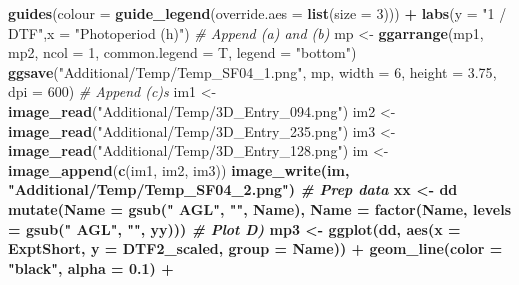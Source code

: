 \documentclass[
]{article}
\newenvironment{Shaded}{\begin{snugshade}}{\end{snugshade}}
\newcommand{\CommentTok}[1]{\textcolor[rgb]{0.56,0.35,0.01}{\textit{#1}}}
\newcommand{\DataTypeTok}[1]{\textcolor[rgb]{0.13,0.29,0.53}{#1}}
\newcommand{\DecValTok}[1]{\textcolor[rgb]{0.00,0.00,0.81}{#1}}
\newcommand{\FloatTok}[1]{\textcolor[rgb]{0.00,0.00,0.81}{#1}}
\newcommand{\KeywordTok}[1]{\textcolor[rgb]{0.13,0.29,0.53}{\textbf{#1}}}
\newcommand{\NormalTok}[1]{#1}
\newcommand{\OperatorTok}[1]{\textcolor[rgb]{0.81,0.36,0.00}{\textbf{#1}}}
\newcommand{\StringTok}[1]{\textcolor[rgb]{0.31,0.60,0.02}{#1}}
\begin{document}
\begin{Shaded}
\begin{Highlighting}[]
{{{{{\StringTok{  }\KeywordTok{guides}\NormalTok{(}\DataTypeTok{colour =} \KeywordTok{guide_legend}\NormalTok{(}\DataTypeTok{override.aes =} \KeywordTok{list}\NormalTok{(}\DataTypeTok{size =} \DecValTok{3}\NormalTok{))) }\OperatorTok{+}
\StringTok{  }\KeywordTok{labs}\NormalTok{(}\DataTypeTok{y =} \StringTok{"1 / DTF"}\NormalTok{,}\DataTypeTok{x =} \StringTok{"Photoperiod (h)"}\NormalTok{)}
\CommentTok{# Append (a) and (b)}
\NormalTok{mp <-}\StringTok{ }\KeywordTok{ggarrange}\NormalTok{(mp1, mp2, }\DataTypeTok{ncol =} \DecValTok{1}\NormalTok{, }\DataTypeTok{common.legend =}\NormalTok{ T, }\DataTypeTok{legend =} \StringTok{"bottom"}\NormalTok{) }
\KeywordTok{ggsave}\NormalTok{(}\StringTok{"Additional/Temp/Temp_SF04_1.png"}\NormalTok{, mp, }\DataTypeTok{width =} \DecValTok{6}\NormalTok{, }\DataTypeTok{height =} \FloatTok{3.75}\NormalTok{, }\DataTypeTok{dpi =} \DecValTok{600}\NormalTok{)}
\CommentTok{# Append (c)s}
\NormalTok{im1 <-}\StringTok{ }\KeywordTok{image_read}\NormalTok{(}\StringTok{"Additional/Temp/3D_Entry_094.png"}\NormalTok{)}
\NormalTok{im2 <-}\StringTok{ }\KeywordTok{image_read}\NormalTok{(}\StringTok{"Additional/Temp/3D_Entry_235.png"}\NormalTok{)}
\NormalTok{im3 <-}\StringTok{ }\KeywordTok{image_read}\NormalTok{(}\StringTok{"Additional/Temp/3D_Entry_128.png"}\NormalTok{)}
\NormalTok{im <-}\StringTok{ }\KeywordTok{image_append}\NormalTok{(}\KeywordTok{c}\NormalTok{(im1, im2, im3)) }\OperatorTok{%
\KeywordTok{image_write}\NormalTok{(im, }\StringTok{"Additional/Temp/Temp_SF04_2.png"}\NormalTok{)}
\CommentTok{# Prep data }
\NormalTok{xx <-}\StringTok{ }\NormalTok{dd }\OperatorTok{%
\StringTok{  }\KeywordTok{mutate}\NormalTok{(}\DataTypeTok{Name =} \KeywordTok{gsub}\NormalTok{(}\StringTok{" AGL"}\NormalTok{, }\StringTok{""}\NormalTok{, Name),}
         \DataTypeTok{Name =} \KeywordTok{factor}\NormalTok{(Name, }\DataTypeTok{levels =} \KeywordTok{gsub}\NormalTok{(}\StringTok{" AGL"}\NormalTok{, }\StringTok{""}\NormalTok{, yy)))}
\CommentTok{# Plot D)}
\NormalTok{mp3 <-}\StringTok{ }\KeywordTok{ggplot}\NormalTok{(dd, }\KeywordTok{aes}\NormalTok{(}\DataTypeTok{x =}\NormalTok{ ExptShort, }\DataTypeTok{y =}\NormalTok{ DTF2_scaled, }\DataTypeTok{group =}\NormalTok{ Name)) }\OperatorTok{+}\StringTok{ }
\StringTok{  }\KeywordTok{geom_line}\NormalTok{(}\DataTypeTok{color =} \StringTok{"black"}\NormalTok{, }\DataTypeTok{alpha =} \FloatTok{0.1}\NormalTok{) }\OperatorTok{+}
}}}}}}}
\end{Highlighting}
\end{Shaded}
\end{document}

